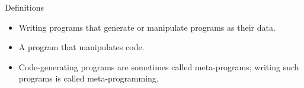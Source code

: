 \begin{frame}{Definitions}
\begin{itemize}
\item Writing programs that generate or manipulate programs as their data.
\item A program that manipulates code.
\item Code-generating programs are sometimes called meta-programs; writing such programs
    is called meta-programming.
\end{itemize}
\end{frame}


